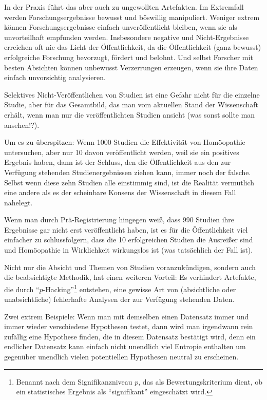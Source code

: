 In der Praxis führt das aber auch zu ungewollten Artefakten. Im Extremfall werden Forschungsergebnisse bewusst und böswillig manipuliert. Weniger extrem können Forschungsergebnisse einfach unveröffentlicht bleiben, wenn sie als unvorteilhaft empfunden werden. Insbesondere negative und Nicht-Ergebnisse erreichen oft nie das Licht der Öffentlichkeit, da die Öffentlichkeit (ganz bewusst) erfolgreiche Forschung bevorzugt, fördert und belohnt. Und selbst Forscher mit besten Absichten können unbewusst Verzerrungen erzeugen, wenn sie ihre Daten einfach unvorsichtig analysieren.

\medskip
Selektives Nicht-Veröffentlichen von Studien ist eine Gefahr nicht für die einzelne Studie, aber für das Gesamtbild, das man vom aktuellen Stand der Wissenschaft erhält, wenn man nur die veröffentlichten Studien ansieht (was sonst sollte man ansehen!?).

Um es zu überspitzen: Wenn 1000 Studien die Effektivität von Homöopathie untersuchen, aber nur 10 davon veröffentlicht werden, weil sie ein positives Ergebnis haben, dann ist der Schluss, den die Öffentlichkeit aus den zur Verfügung stehenden Studienergebnissen ziehen kann, immer noch der falsche. Selbst wenn diese zehn Studien alle einstimmig sind, ist die Realität vermutlich eine andere als es der scheinbare Konsens der Wissenschaft in diesem Fall nahelegt.

Wenn man durch Prä-Registrierung hingegen weiß, dass 990 Studien ihre Ergebnisse gar nicht erst veröffentlicht haben, ist es für die Öffentlichkeit viel einfacher zu schlussfolgern, dass die 10 erfolgreichen Studien die Ausreißer sind und Homöopathie in Wirklichkeit wirkungslos ist (was tatsächlich der Fall ist).

\medskip
Nicht nur die Absicht und Themen von Studien voranzukündigen, sondern auch die beabsichtigte Methodik, hat einen weiteren Vorteil: Es verhindert Artefakte, die durch \enquote{$p$-Hacking}\footnote{Benannt nach dem Signifikanzniveau $p$, das als Bewertungskriterium dient, ob ein statistisches Ergebnis als \enquote{signifikant} eingeschätzt wird.} entstehen, eine gewisse Art  von (absichtliche oder unabsichtliche) fehlerhafte Analysen der zur Verfügung stehenden Daten.

\smallskip
Zwei extrem Beispiele: Wenn man mit demselben einen Datensatz immer und immer wieder verschiedene Hypothesen testet, dann wird man irgendwann rein zufällig eine Hypothese finden, die in diesem Datensatz bestätigt wird, denn ein endlicher Datensatz kann einfach nicht unendlich viel Entropie enthalten um gegenüber unendlich vielen potentiellen Hypothesen neutral zu erscheinen.

